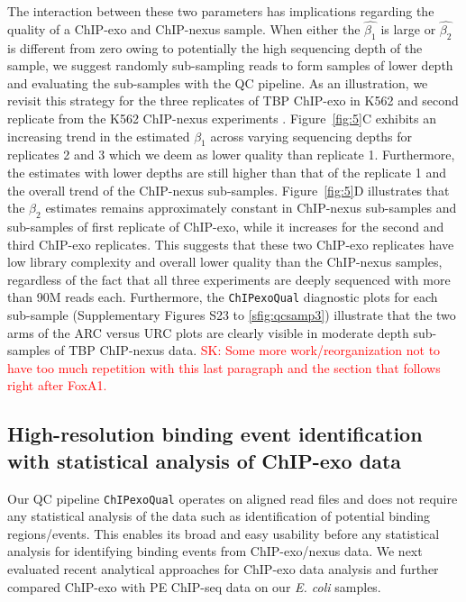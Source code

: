\documentclass{bmcart}
\newcommand{\pname}[1]{\texttt{ChIPexoQual}}
\newcommand{\SK}[1]{\textcolor{red}{SK: #1}}
\begin{document}
The interaction between these two parameters has implications
regarding the quality of a ChIP-exo and ChIP-nexus sample. When either
the $\hat{\beta_1}$ is large or $\hat{\beta_2}$ is different
from zero 
owing to potentially the high sequencing depth of the sample, we
suggest randomly sub-sampling reads to form samples of lower depth and
evaluating the sub-samples with the QC pipeline.  As an illustration,
we revisit this strategy for the three replicates of TBP ChIP-exo in
K562 \cite{venters13} and second replicate from the K562 ChIP-nexus
experiments \cite{chipnexus}. Figure~\ref{fig:5}C exhibits an
increasing trend in the estimated $\beta_1$ across varying sequencing
depths for replicates 2 and 3 which we deem as lower quality than
replicate 1. Furthermore, the estimates with lower depths are still
higher than that of the replicate 1 and the overall trend of the
ChIP-nexus sub-samples.
Figure~\ref{fig:5}D illustrates that the $\beta_2$ estimates remains
approximately constant in ChIP-nexus sub-samples and sub-samples of
first replicate of ChIP-exo, while it increases for the second and
third ChIP-exo replicates. This suggests that these two ChIP-exo
replicates have low library complexity and overall lower quality than
the ChIP-nexus samples, regardless of the fact that all three
experiments are deeply sequenced with more than 90M reads
each. Furthermore, the \pname{} diagnostic plots for each sub-sample
(Supplementary Figures S23 to \ref{sfig:qcsamp3}) illustrate that the
two arms of the ARC versus URC plots are clearly visible in moderate
depth sub-samples of TBP ChIP-nexus data.  \SK{Some more
  work/reorganization not to have too much repetition with this last
  paragraph and the section that follows right after FoxA1.}

\subsection*{High-resolution binding event identification with
  statistical analysis of ChIP-exo data}

Our QC pipeline \pname{} operates on aligned read files and does not
require any statistical analysis of the data such as identification of
potential binding regions/events. This enables its broad and easy
usability before any statistical analysis for identifying binding
events from ChIP-exo/nexus data.  We next evaluated recent analytical
approaches for ChIP-exo data analysis and further compared ChIP-exo
with PE ChIP-seq data on our \textit{E. coli} samples.
\end{document}
